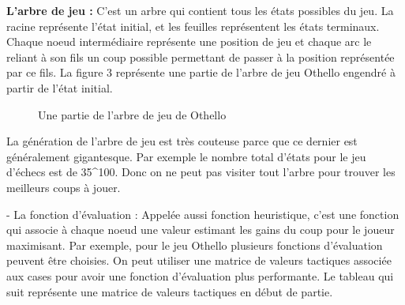 \documentclass[11pt]{article}
\newcommand{\tmtextbf}[1]{{\bfseries{#1}}}
\begin{document}
\tmtextbf{L'arbre de jeu :}\tmtextbf{} C'est un arbre qui contient tous les
états possibles du jeu. La racine représente l'état initial, et
les feuilles représentent les états terminaux. Chaque noeud
intermédiaire représente une position de jeu et chaque arc le reliant
à son fils un coup possible permettant de passer à la position
représentée par ce fils. La figure 3 représente une partie de
l'arbre de jeu Othello engendré à partir de l'état initial.


\begin{figure}[h]
  \caption {Une partie de l'arbre de jeu de Othello}
  \noindent{}
\end{figure}



La génération de l'arbre de jeu est très couteuse parce que ce
dernier est généralement gigantesque. Par exemple le nombre total
d'états pour le jeu d'échecs est de 35\^{}100. Donc on ne peut pas
visiter tout l'arbre pour trouver les meilleurs coups à jouer.

- La fonction d'évaluation : Appelée aussi fonction heuristique, c'est
une fonction qui associe à chaque noeud une valeur estimant les gains du
coup pour le joueur maximisant. Par exemple, pour le jeu Othello plusieurs
fonctions d'évaluation peuvent être choisies. On peut utiliser une
matrice de valeurs tactiques associée aux cases pour avoir une fonction
d'évaluation plus performante. Le tableau qui suit représente une
matrice de valeurs tactiques en début de partie.
\end{document}
